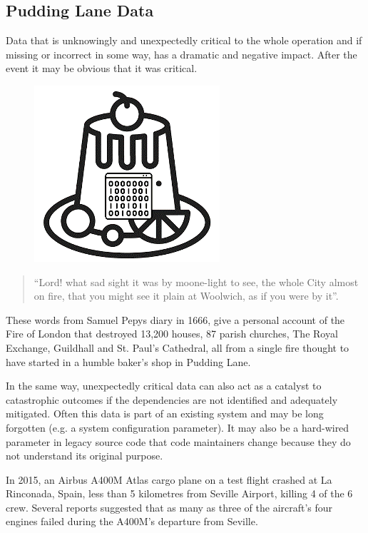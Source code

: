 \subsection{Pudding Lane Data}
 Data that is unknowingly and unexpectedly critical to the whole operation and if missing or incorrect in some way, has a dramatic and negative impact. After the event it may be obvious that it was critical.

\begin{figure}
  \includegraphics{images/cygPudding}
\end{figure}
\begin{quote}
“Lord! what sad sight it was by moone-light to see, the whole City almost on fire,
that you might see it plain at Woolwich, as if you were by it”.
\end{quote}

These words from Samuel Pepys diary in 1666, give a personal account of the Fire of London that
destroyed 13,200 houses, 87 parish churches, The Royal Exchange, Guildhall and St. Paul’s Cathedral,
all from a single fire thought to have started in a humble baker’s shop in Pudding Lane.

In the same way, unexpectedly critical data can also act as a catalyst to catastrophic outcomes
if the dependencies are not identified and adequately mitigated.
Often this data is part of an existing system and may be long forgotten
(e.g. a system configuration parameter).
It may also be a hard-wired parameter in legacy source code that code maintainers change because
they do not understand its original purpose.

In 2015, an Airbus A400M Atlas cargo plane on a test flight crashed at La Rinconada, Spain,
less than 5 kilometres from Seville Airport, killing 4 of the 6 crew.
Several reports suggested that as many as three of the aircraft's four engines failed during
the A400M's departure from Seville.

